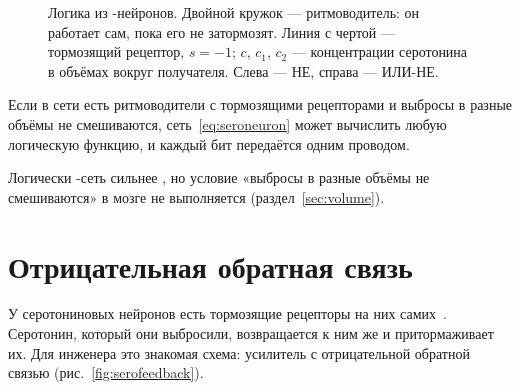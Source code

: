 \begin{figure}[t]
\centering
{}
\caption{Логика из -нейронов. Двойной кружок --- ритмоводитель: он работает сам, пока его не затормозят. Линия с чертой --- тормозящий рецептор, $s=-1$; $c$, $c_1$, $c_2$ --- концентрации серотонина в объёмах вокруг получателя. Слева --- НЕ, справа --- ИЛИ-НЕ.}
\label{fig:serogates}
\end{figure}

\begin{keyblock}
\begin{proposition}
\label{prop:serocomplete}
Если в сети есть ритмоводители с тормозящими рецепторами и выбросы в разные объёмы не смешиваются, сеть~\eqref{eq:seroneuron} может вычислить любую логическую функцию, и каждый бит передаётся одним проводом.
\end{proposition}
\end{keyblock}

Логически -сеть сильнее , но условие «выбросы в разные объёмы не смешиваются» в мозге не выполняется (раздел~\ref{sec:volume}).

\section{Отрицательная обратная связь}

У серотониновых нейронов есть тормозящие рецепторы на них самих~\cite{Sprouse1987}. Серотонин, который они выбросили, возвращается к ним же и притормаживает их. Для инженера это знакомая схема: усилитель с отрицательной обратной связью (рис.~\ref{fig:serofeedback}).

